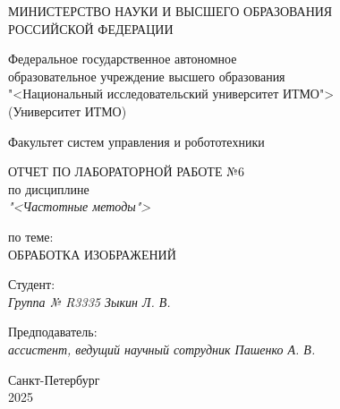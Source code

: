 \thispagestyle{empty}

\begin{center}
    МИНИСТЕРСТВО НАУКИ И ВЫСШЕГО ОБРАЗОВАНИЯ \\ РОССИЙСКОЙ ФЕДЕРАЦИИ

    \vspace{20pt}

    Федеральное государственное автономное \\ образовательное учреждение высшего образования \\
    "<Национальный исследовательский университет ИТМО"> \\
    (Университет ИТМО)

    \vspace{20pt}

    Факультет систем управления и робототехники
\end{center}

\vfill

\begin{center}
    ОТЧЕТ ПО ЛАБОРАТОРНОЙ РАБОТЕ №6\\  
    по дисциплине \\
    \textit{"<Частотные методы">}

    \vspace{20pt}

    по теме: \\
    \uppercase{Обработка изображений}
\end{center}

\vfill

    \noindent Студент: \\
    \textit{Группа № R3335 \hfill Зыкин Л. В.}

    \vspace{20pt}

    \noindent Предподаватель: \\
    \textit{ассистент, ведущий научный сотрудник \hfill Пашенко А. В.}

\vfill

\begin{center}
    Санкт-Петербург \\ 2025
\end{center}